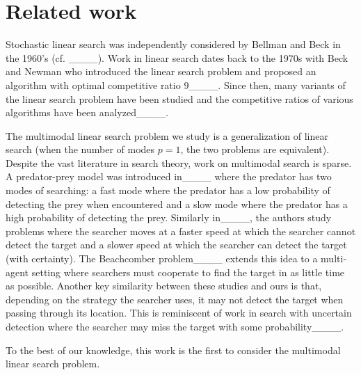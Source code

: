 \section{Related work}
Stochastic linear search was independently considered by Bellman and Beck in the 1960's (cf. ____). Work in linear search dates back to the 1970s with Beck and Newman who introduced the linear search problem and proposed an algorithm with optimal competitive ratio $9$____.
Since then, many variants of the linear search problem have been studied and the competitive ratios of various algorithms have been analyzed____. %

The multimodal linear search problem we study is a generalization of linear search (when the number of modes $p=1$, the two problems are equivalent).
Despite the vast literature in search theory, work on multimodal search is sparse.
A predator-prey model was introduced in____ where the predator has two modes of searching: a fast mode where the predator has a low probability of detecting the prey when encountered and a slow mode where the predator has a high probability of detecting the prey.
Similarly in____, the authors study problems where the searcher moves at a faster speed at which the searcher cannot detect the target and a slower speed at which the searcher can detect the target (with certainty).
The Beachcomber problem____ extends this idea to a multi-agent setting where searchers must cooperate to find the target in as little time as possible.
Another key similarity between these studies and ours is that, depending on the strategy the searcher uses, it may not detect the target when passing through its location.
This is reminiscent of work in search with uncertain detection where the searcher may miss the target with some probability____.  %

To the best of our knowledge, this work is the first to consider the multimodal linear search problem.